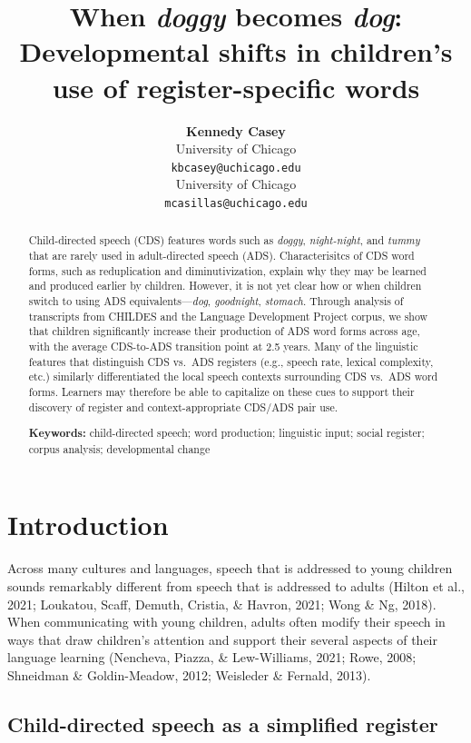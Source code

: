 \documentclass[10pt, letterpaper]{article}
\title{When \emph{doggy} becomes \emph{dog}: Developmental shifts in
children's use of register-specific words}
\author{{\large \bf Kennedy Casey} \\ University of Chicago \\ \texttt{kbcasey@uchicago.edu} \And {\large \bf Marisa Casillas} \\ University of Chicago \\ \texttt{mcasillas@uchicago.edu}}
\begin{document}
\maketitle

\begin{abstract}
Child-directed speech (CDS) features words such as \emph{doggy},
\emph{night-night}, and \emph{tummy} that are rarely used in
adult-directed speech (ADS). Characterisitcs of CDS word forms, such as
reduplication and diminutivization, explain why they may be learned and
produced earlier by children. However, it is not yet clear how or when
children switch to using ADS equivalents---\emph{dog}, \emph{goodnight},
\emph{stomach}. Through analysis of transcripts from CHILDES and the
Language Development Project corpus, we show that children significantly
increase their production of ADS word forms across age, with the average
CDS-to-ADS transition point at 2.5 years. Many of the linguistic
features that distinguish CDS vs.~ADS registers (e.g., speech rate,
lexical complexity, etc.) similarly differentiated the local speech
contexts surrounding CDS vs.~ADS word forms. Learners may therefore be
able to capitalize on these cues to support their discovery of register
and context-appropriate CDS/ADS pair use.

\textbf{Keywords:}
child-directed speech; word production; linguistic input; social
register; corpus analysis; developmental change
\end{abstract}

\hypertarget{introduction}{%
\section{Introduction}\label{introduction}}

Across many cultures and languages, speech that is addressed to young
children sounds remarkably different from speech that is addressed to
adults (Hilton et al., 2021; Loukatou, Scaff, Demuth, Cristia, \&
Havron, 2021; Wong \& Ng, 2018). When communicating with young children,
adults often modify their speech in ways that draw children's attention
and support their several aspects of their language learning (Nencheva,
Piazza, \& Lew-Williams, 2021; Rowe, 2008; Shneidman \& Goldin-Meadow,
2012; Weisleder \& Fernald, 2013).

\hypertarget{child-directed-speech-as-a-simplified-register}{%
\subsection{Child-directed speech as a simplified
register}\label{child-directed-speech-as-a-simplified-register}}
\end{document}
